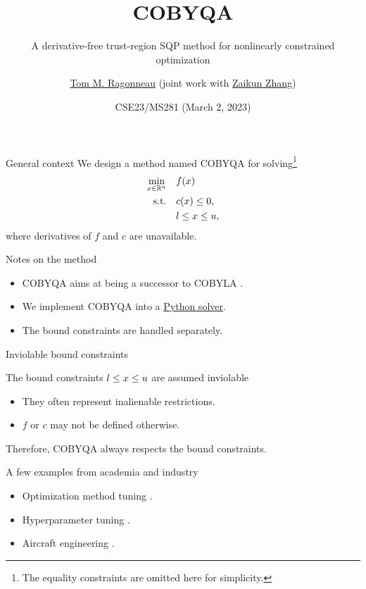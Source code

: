 \documentclass[
]{presentation}
\title{COBYQA}
\subtitle{A derivative-free trust-region SQP method for nonlinearly constrained optimization}
\date{CSE23/MS281 (March 2, 2023)}
\author{\href{https://www.tomragonneau.com/}{Tom M. Ragonneau} (joint work with \href{https://www.zhangzk.net/}{Zaikun Zhang})}
\institute{
    Department of Applied Mathematics\\
    The Hong Kong Polytechnic University
}
\newcommand{\obj}{f}
\newcommand{\con}{c}
\newcommand{\iter}[1][]{x\ifblank{#1}{}{^{#1}}}
\newcommand{\xl}{l}
\newcommand{\xu}{u}
\begin{document}
\maketitle

\begin{frame}{General context}
    We design a method named COBYQA for solving\footnote{The equality constraints are omitted here for simplicity.}
    \begin{align*}
        \min_{\iter \in \R^n}   & \quad \obj(\iter)\\
        \mathrm{s.t.}           & \quad \con(\iter) \le 0,\\
                                & \quad \xl \le \iter \le \xu,
    \end{align*}
    where derivatives of $\obj$ and $\con$ are \alert{unavailable}.

    \medskip

    \begin{block}{Notes on the method}
        \begin{itemize}
            \item COBYQA aims at being a \alert{successor} to COBYLA \parencite{Powell_1994}.
            \item We \alert{implement} COBYQA into a \href{https://pypi.org/project/cobyqa/}{Python solver}.
            \item The bound constraints are handled \alert{separately}.
        \end{itemize}
    \end{block}
\end{frame}

\begin{frame}{Inviolable bound constraints}
    \begin{block}{The bound constraints $\xl \le \iter \le \xu$ are assumed inviolable}
        \begin{itemize}
            \item They often represent \alert{inalienable} restrictions.
            \item $\obj$ or $\con$ may not be defined otherwise.
        \end{itemize}
    \end{block}

    \medskip

    Therefore, COBYQA \alert{always} respects the bound constraints.

    \medskip

    \begin{block}{A few examples from academia and industry}
        \begin{itemize}
            \item Optimization method tuning \parencite{Audet_Orban_2006}.
            \item Hyperparameter tuning \parencite{Ghanbari_Scheinberg_2017}.
            \item Aircraft engineering \parencite{Gazaix_Etal_2019}.
        \end{itemize}
    \end{block}
\end{frame}
\end{document}
